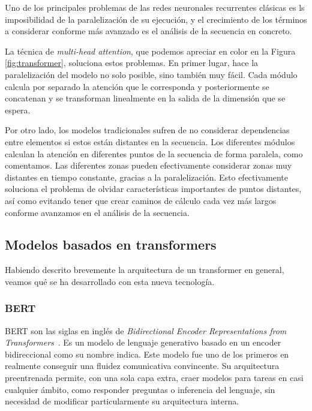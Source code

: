 Uno de los principales problemas de las redes neuronales recurrentes clásicas es ls imposibilidad de la paralelización de su ejecución, y el crecimiento de los términos a considerar conforme más avanzado es el análisis de la secuencia en concreto.

La técnica de \textit{multi-head attention}, que podemos apreciar en color en la Figura \ref{fig:transformer}, soluciona estos problemas. En primer lugar, hace la paralelización del modelo no solo posible, sino también muy fácil. Cada módulo calcula por separado la atención que le corresponda y posteriormente se concatenan y se transforman linealmente en la salida de la dimensión que se espera. 

Por otro lado, los modelos tradicionales sufren de no considerar dependencias entre elementos si estos están distantes en la secuencia. Los diferentes módulos calculan la atención en diferentes puntos de la secuencia de forma paralela, como comentamos. Las diferentes zonas pueden efectivamente considerar zonas muy distantes en tiempo constante, gracias a la paralelización. Esto efectivamente soluciona el problema de olvidar características importantes de puntos distantes, así como evitando tener que crear caminos de cálculo cada vez más largos conforme avanzamos en el análisis de la secuencia.


\subsection{Modelos basados en transformers}
Habiendo descrito brevemente la arquitectura de un transformer en general, veamos qué se ha desarrollado con esta nueva tecnología.

\subsubsection{BERT}
BERT son las siglas en inglés de \textit{Bidirectional Encoder Representations from Transformers}~\cite{bertDevlin2019}. Es un modelo de lenguaje generativo basado en un encoder bidireccional como su nombre indica. Este modelo fue uno de los primeros en realmente conseguir una fluidez comunicativa convincente. Su arquitectura preentrenada permite, con una sola capa extra, craer modelos para tareas en casi cualquier ámbito, como responder preguntas o inferencia del lenguaje, sin necesidad de modificar particularmente su arquitectura interna.


